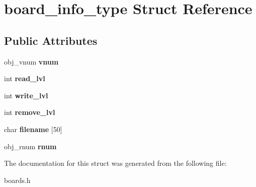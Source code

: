 \hypertarget{structboard__info__type}{}\section{board\+\_\+info\+\_\+type Struct Reference}
\label{structboard__info__type}
\subsection*{Public Attributes}
\begin{DoxyCompactItemize}
\item 
\mbox{\label{structboard__info__type_a35002c20c7cd706e0bb7532906f8f100}} 
obj\+\_\+vnum {\bfseries vnum}
\item 
\mbox{\label{structboard__info__type_a5780514990ab56c0fc713d471e622545}} 
int {\bfseries read\+\_\+lvl}
\item 
\mbox{\label{structboard__info__type_a915e2d013ccf9fb3438d9eebe085ce11}} 
int {\bfseries write\+\_\+lvl}
\item 
\mbox{\label{structboard__info__type_af618a4b4282e57eb1c9b233b686c0e88}} 
int {\bfseries remove\+\_\+lvl}
\item 
\mbox{\label{structboard__info__type_aff84c710d8a8345ed58c2b1cf69605fb}} 
char {\bfseries filename} \mbox{[}50\mbox{]}
\item 
\mbox{\label{structboard__info__type_aa1a80845222a2220c54cce7abae882de}} 
obj\+\_\+rnum {\bfseries rnum}
\end{DoxyCompactItemize}


The documentation for this struct was generated from the following file\+:\begin{DoxyCompactItemize}
\item 
boards.\+h\end{DoxyCompactItemize}
